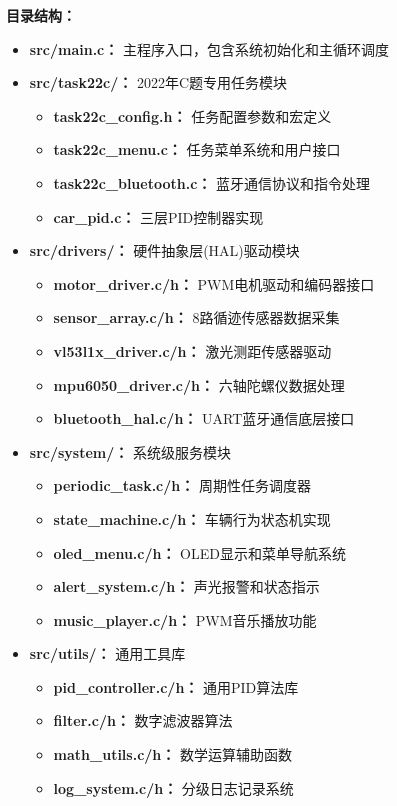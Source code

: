 \documentclass[UTF8]{ctexart}
\begin{document}
\textbf{目录结构：}
\begin{itemize}
    \item \textbf{src/main.c：} 主程序入口，包含系统初始化和主循环调度
    \item \textbf{src/task22c/：} 2022年C题专用任务模块
    \begin{itemize}
        \item \textbf{task22c\_config.h：} 任务配置参数和宏定义
        \item \textbf{task22c\_menu.c：} 任务菜单系统和用户接口
        \item \textbf{task22c\_bluetooth.c：} 蓝牙通信协议和指令处理
        \item \textbf{car\_pid.c：} 三层PID控制器实现
    \end{itemize}
    \item \textbf{src/drivers/：} 硬件抽象层(HAL)驱动模块
    \begin{itemize}
        \item \textbf{motor\_driver.c/h：} PWM电机驱动和编码器接口
        \item \textbf{sensor\_array.c/h：} 8路循迹传感器数据采集
        \item \textbf{vl53l1x\_driver.c/h：} 激光测距传感器驱动
        \item \textbf{mpu6050\_driver.c/h：} 六轴陀螺仪数据处理
        \item \textbf{bluetooth\_hal.c/h：} UART蓝牙通信底层接口
    \end{itemize}
    \item \textbf{src/system/：} 系统级服务模块
    \begin{itemize}
        \item \textbf{periodic\_task.c/h：} 周期性任务调度器
        \item \textbf{state\_machine.c/h：} 车辆行为状态机实现
        \item \textbf{oled\_menu.c/h：} OLED显示和菜单导航系统
        \item \textbf{alert\_system.c/h：} 声光报警和状态指示
        \item \textbf{music\_player.c/h：} PWM音乐播放功能
    \end{itemize}
    \item \textbf{src/utils/：} 通用工具库
    \begin{itemize}
        \item \textbf{pid\_controller.c/h：} 通用PID算法库
        \item \textbf{filter.c/h：} 数字滤波器算法
        \item \textbf{math\_utils.c/h：} 数学运算辅助函数
        \item \textbf{log\_system.c/h：} 分级日志记录系统
    \end{itemize}
\end{itemize}
\end{document}

